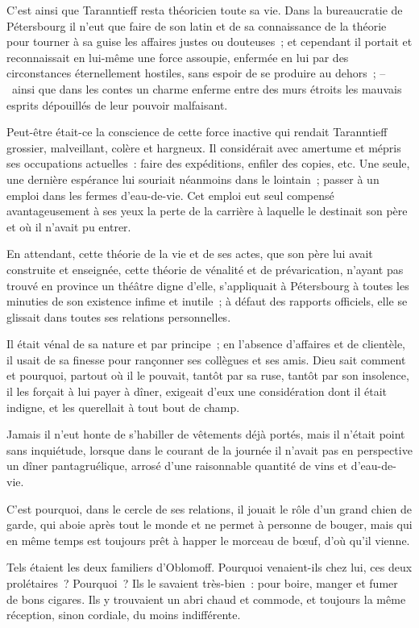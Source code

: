 \documentclass[french,twoside]{book} %
\begin{document}
C’est ainsi que Taranntieff resta théoricien toute sa vie. Dans la bureaucratie de Pétersbourg il n’eut que faire de son latin et de sa connaissance de la théorie pour tourner à sa guise les affaires justes ou douteuses ; et cependant il portait et reconnaissait en lui-même une force assoupie, enfermée en lui par des circonstances éternellement hostiles, sans espoir de se produire au dehors ; – ainsi que dans les contes un charme enferme entre des murs étroits les mauvais esprits dépouillés de leur pouvoir malfaisant.\par
Peut-être était-ce la conscience de cette force inactive qui rendait Taranntieff grossier, malveillant, colère et hargneux. Il considérait avec amertume et mépris ses occupations actuelles : faire des expéditions, enfiler des copies, etc. Une seule, une dernière espérance lui souriait néanmoins dans le lointain ; passer à un emploi dans les fermes d’eau-de-vie. Cet emploi eut seul compensé avantageusement à ses yeux la perte de la carrière à laquelle le destinait son père et où il n’avait pu entrer.\par
En attendant, cette théorie de la vie et de ses actes, que son père lui avait construite et enseignée, cette théorie de vénalité et de prévarication, n’ayant pas trouvé en province un théâtre digne d’elle, s’appliquait à Pétersbourg à toutes les minuties de son existence infime et inutile ; à défaut des rapports officiels, elle se glissait dans toutes ses relations personnelles.\par
Il était vénal de sa nature et par principe ; en l’absence d’affaires et de clientèle, il usait de sa finesse pour rançonner ses collègues et ses amis. Dieu sait comment et pourquoi, partout où il le pouvait, tantôt par sa ruse, tantôt par son insolence, il les forçait à lui payer à dîner, exigeait d’eux une considération dont il était indigne, et les querellait à tout bout de champ.\par
Jamais il n’eut honte de s’habiller de vêtements déjà portés, mais il n’était point sans inquiétude, lorsque dans le courant de la journée il n’avait pas en perspective un dîner pantagruélique, arrosé d’une raisonnable quantité de vins et d’eau-de-vie.\par
C’est pourquoi, dans le cercle de ses relations, il jouait le rôle d’un grand chien de garde, qui aboie après tout le monde et ne permet à personne de bouger, mais qui en même temps est toujours prêt à happer le morceau de bœuf, d’où qu’il vienne.\par
Tels étaient les deux familiers d’Oblomoff. Pourquoi venaient-ils chez lui, ces deux prolétaires ? Pourquoi ? Ils le savaient très-bien : pour boire, manger et fumer de bons cigares. Ils y trouvaient un abri chaud et commode, et toujours la même réception, sinon cordiale, du moins indifférente.\par
\end{document}
